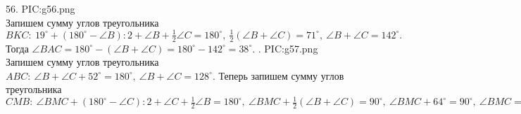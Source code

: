 56. {{PIC:g56.png}}\\
Запишем сумму углов треугольника $BKC:\ 19^\circ+(180^\circ-\angle B):2+\angle B+\frac{1}{2}\angle C=180^\circ,\ \frac{1}{2}(\angle B+\angle C)=71^\circ,\ \angle B+\angle C=142^\circ.$ Тогда $\angle BAC=180^\circ-(\angle B+\angle C)=180^\circ-142^\circ=38^\circ.$\newpage
{}. {{PIC:g57.png}}\\
Запишем сумму углов треугольника $ABC:\ \angle B+\angle C+52^\circ=180^\circ,\ \angle B+\angle C=128^\circ.$ Теперь запишем сумму углов треугольника $CMB:\ \angle BMC+(180^\circ-\angle C):2+\angle C+\frac{1}{2}\angle B=180^\circ,\ \angle BMC+\frac{1}{2}(\angle B+\angle C)=90^\circ,\ \angle BMC+64^\circ=90^\circ,\ \angle BMC=26^\circ.$\\
